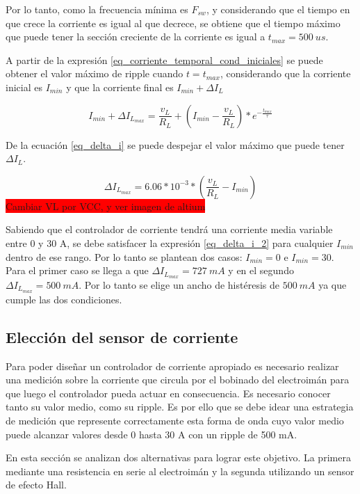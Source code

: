 Por lo tanto, como la frecuencia mínima es $F_{sw}$, y considerando que el tiempo en que crece la corriente es igual al que decrece, se obtiene que el tiempo máximo que puede tener la sección creciente de la corriente es igual a $t_{max}=500\:us$. 

A partir de la expresión \ref{eq_corriente_temporal_cond_iniciales} se puede obtener el valor máximo de ripple cuando $t=t_{max}$, considerando que la corriente inicial es $I_{min}$ y que la corriente final es $I_{min}+\Delta I_L$

\begin{equation} \label{eq_delta_i}
	I_{min}+\Delta I_{L_{max}}=\frac{v_L}{R_L}+(I_{min}-\frac{v_L}{R_L})*e^{-\frac{t_{max}}{\tau}}
\end{equation}

De la ecuación \ref{eq_delta_i} se puede despejar el valor máximo que puede tener $\Delta I_L$. 

\begin{equation} \label{eq_delta_i_2}
	\Delta I_{L_{max}}=6.06*10^{-3}*(\frac{v_L}{R_L}-I_{min})
\end{equation}
\colorbox{red}{Cambiar VL por VCC, y ver imagen de altium}

Sabiendo que el controlador de corriente tendrá una corriente media variable entre 0 y 30 A, se debe satisfacer la expresión \ref{eq_delta_i_2} para cualquier $I_{min}$ dentro de ese rango. Por lo tanto se plantean dos casos: $I_{min}=0$ e $I_{min}=30$. Para el primer caso se llega a que $\Delta I_{L_{max}}=727\:mA$ y en el segundo $\Delta I_{L_{max}}=500\:mA$. Por lo tanto se elige un ancho de histéresis de $500\:mA$ ya que cumple las dos condiciones.

\subsection{Elección del sensor de corriente}

Para poder diseñar un controlador de corriente apropiado es necesario realizar una medición sobre la corriente que circula por el bobinado del electroimán para que luego el controlador pueda actuar en consecuencia. Es necesario conocer tanto su valor medio, como su ripple. Es por ello que se debe idear una estrategia de medición que represente correctamente esta forma de onda cuyo valor medio puede alcanzar valores desde 0 hasta 30 A con un ripple de 500 mA.

En esta sección se analizan dos alternativas para lograr este objetivo. La primera mediante una resistencia en serie al electroimán y la segunda utilizando un sensor de efecto Hall.


